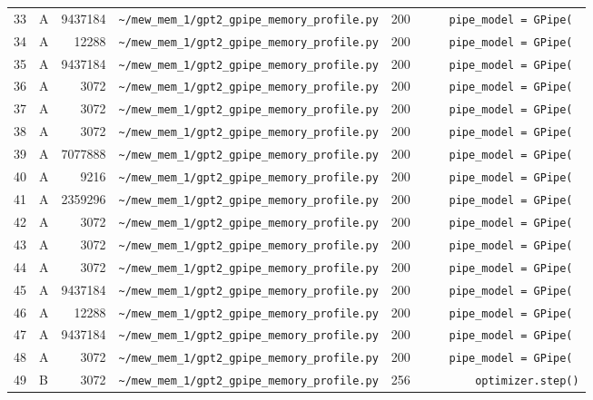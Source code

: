 \documentclass{article}
\begin{document}
\begin{longtable}{r l r p{6.5cm} r p{7.0cm}}
33 & A & 9437184 & \lstinline|~/mew_mem_1/gpt2_gpipe_memory_profile.py| & 200 & \lstinline|    pipe_model = GPipe(| \\
34 & A & 12288 & \lstinline|~/mew_mem_1/gpt2_gpipe_memory_profile.py| & 200 & \lstinline|    pipe_model = GPipe(| \\
35 & A & 9437184 & \lstinline|~/mew_mem_1/gpt2_gpipe_memory_profile.py| & 200 & \lstinline|    pipe_model = GPipe(| \\
36 & A & 3072 & \lstinline|~/mew_mem_1/gpt2_gpipe_memory_profile.py| & 200 & \lstinline|    pipe_model = GPipe(| \\
37 & A & 3072 & \lstinline|~/mew_mem_1/gpt2_gpipe_memory_profile.py| & 200 & \lstinline|    pipe_model = GPipe(| \\
38 & A & 3072 & \lstinline|~/mew_mem_1/gpt2_gpipe_memory_profile.py| & 200 & \lstinline|    pipe_model = GPipe(| \\
39 & A & 7077888 & \lstinline|~/mew_mem_1/gpt2_gpipe_memory_profile.py| & 200 & \lstinline|    pipe_model = GPipe(| \\
40 & A & 9216 & \lstinline|~/mew_mem_1/gpt2_gpipe_memory_profile.py| & 200 & \lstinline|    pipe_model = GPipe(| \\
41 & A & 2359296 & \lstinline|~/mew_mem_1/gpt2_gpipe_memory_profile.py| & 200 & \lstinline|    pipe_model = GPipe(| \\
42 & A & 3072 & \lstinline|~/mew_mem_1/gpt2_gpipe_memory_profile.py| & 200 & \lstinline|    pipe_model = GPipe(| \\
43 & A & 3072 & \lstinline|~/mew_mem_1/gpt2_gpipe_memory_profile.py| & 200 & \lstinline|    pipe_model = GPipe(| \\
44 & A & 3072 & \lstinline|~/mew_mem_1/gpt2_gpipe_memory_profile.py| & 200 & \lstinline|    pipe_model = GPipe(| \\
45 & A & 9437184 & \lstinline|~/mew_mem_1/gpt2_gpipe_memory_profile.py| & 200 & \lstinline|    pipe_model = GPipe(| \\
46 & A & 12288 & \lstinline|~/mew_mem_1/gpt2_gpipe_memory_profile.py| & 200 & \lstinline|    pipe_model = GPipe(| \\
47 & A & 9437184 & \lstinline|~/mew_mem_1/gpt2_gpipe_memory_profile.py| & 200 & \lstinline|    pipe_model = GPipe(| \\
48 & A & 3072 & \lstinline|~/mew_mem_1/gpt2_gpipe_memory_profile.py| & 200 & \lstinline|    pipe_model = GPipe(| \\
49 & B & 3072 & \lstinline|~/mew_mem_1/gpt2_gpipe_memory_profile.py| & 256 & \lstinline|        optimizer.step()| \\

\end{longtable}
\end{document}
